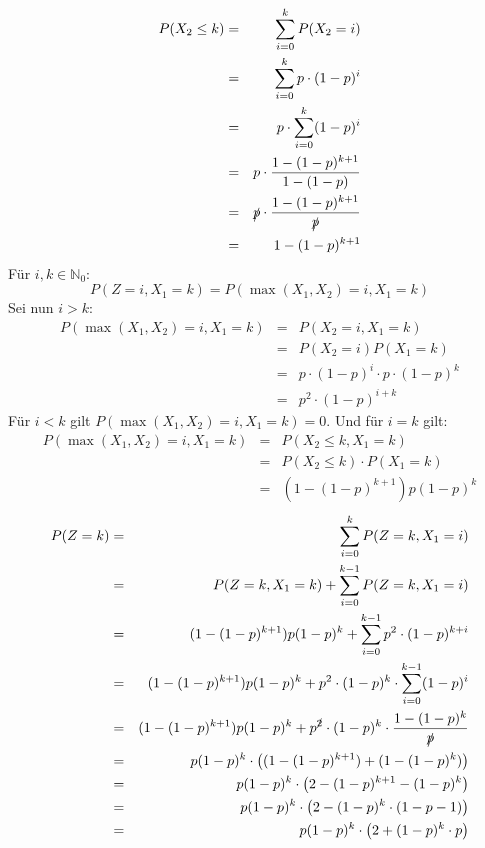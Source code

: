 \begin{Answer}
	\Question
	\begin{eqnarray*}
		P(X_2\leq k)&=&\sum_{i=0}^{k}P(X_2=i)\\
		&=&\sum_{i=0}^{k}p\cdot (1-p)^{i}\\
		&=&p\cdot\sum_{i=0}^{k} (1-p)^{i}\\
		&=&p\cdot \frac{1-(1-p)^{k+1}}{1-(1-p)}\\
		&=&\slashed{p}\cdot \frac{1-(1-p)^{k+1}}{\slashed{p}}\\
		&=&1-(1-p)^{k+1}
	\end{eqnarray*}
\Question Für $i,k\in\mathbb{N}_0$:
\begin{equation*}
	P(Z=i,X_1=k)=P(\max(X_1,X_2)=i,X_1=k)
\end{equation*}
Sei nun $i>k$:
\begin{eqnarray*}
	P(\max(X_1,X_2)=i,X_1=k)&=&P(X_2=i,X_1=k)\\
	&=&P(X_2=i)P(X_1=k)\\
	&=&p\cdot (1-p)^{i}\cdot p \cdot (1-p)^k\\
	&=&p^2\cdot (1-p)^{i+k}
\end{eqnarray*}
Für $i<k$ gilt $P(\max(X_1,X_2)=i,X_1=k)=0$. Und für $i=k$ gilt:
\begin{eqnarray*}
	P(\max(X_1,X_2)=i,X_1=k)&=&P(X_2\leq k,X_1=k)\\
	&=&P(X_2\leq k)\cdot P(X_1=k)\\
	&=&(1-(1-p)^{k+1})p(1-p)^k
\end{eqnarray*}
\Question 
\begin{eqnarray*}
	P(Z=k)&=&\sum_{i=0}^kP(Z=k,X_1=i)\\
	&=&P(Z=k,X_1=k)+\sum_{i=0}^{k-1}P(Z=k,X_1=i)\\
	&=&(1-(1-p)^{k+1})p(1-p)^k+\sum_{i=0}^{k-1}p^2\cdot (1-p)^{k+i}\\
	&=&(1-(1-p)^{k+1})p(1-p)^k+p^2\cdot (1-p)^k\cdot\sum_{i=0}^{k-1}(1-p)^{i}\\
	&=&(1-(1-p)^{k+1})p(1-p)^k+p^{\slashed{2}}\cdot (1-p)^k\cdot\frac{1-(1-p)^k}{\slashed{p}}\\
	&=&p(1-p)^k\cdot\left((1-(1-p)^{k+1})+(1-(1-p)^k)\right)\\
	&=& p(1-p)^k\cdot\left(2-(1-p)^{k+1}-(1-p)^k\right)\\
	&=&p(1-p)^k\cdot\left(2-(1-p)^k\cdot(1-p-1)\right)\\
	&=&p(1-p)^k\cdot\left(2+(1-p)^k\cdot p\right)
\end{eqnarray*}
\end{Answer}


